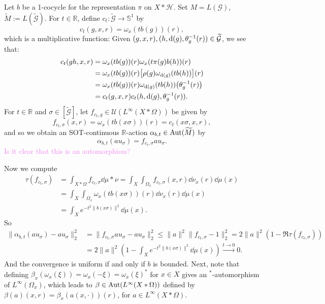 \documentclass[a4paper,11pt]{article}
\numberwithin{equation}{section}
\theoremstyle{definition}
\theoremstyle{remark}
\numberwithin{equation}{section}
\newcommand{\rG}{\mathcal{G}}
\def\H{\mathcal H}
\def\R{\mathbb{R}}
\newcommand{\Aut}{{\rm Aut}}
\def\d{{\rm d}}
\providecommand{\norm}[1]{\lVert#1\rVert}
\newcommand{\lr}[1]{\left(#1\right)}
\numberwithin{equation}{section}
\begin{document}
Let $ b $ be a 1-cocycle for the representation $ \pi $ on $ X*\H $. Set $ M = L(\rG) $, $ \widetilde{M}:=L(\widetilde{\rG}) $. For $ t\in\R $, define $ c_{t}:\widetilde{\rG}\to \mathbb S^{1} $ by
$$
  c_{t}(g,x,r) = \omega_{x}(tb(g))(r),
$$ which is a multiplicative function: Given $(g,x,r),(h,\d(g),\theta_g^{-1}(r))\in \widetilde{\rG}$, we see that: 
\begin{align*}
    c_t(gh,x,r)&=\omega_{x}(tb(g))(r)\omega_{x}(t\pi(g)b(h))(r) \\
&=\omega_{x}(tb(g))(r)\big[\rho(g)\omega_{\d(g)}(tb(h))\big](r) \\
&=\omega_{x}(tb(g))(r)\omega_{\d(g)}(tb(h))\big(\theta_g^{-1}(r)\big) \\
&=c_t(g,x,r)c_t(h,\d(g),\theta_g^{-1}(r)).
\end{align*} 
For $ t\in\R $ and $ \sigma\in [\widetilde{\rG}] $, let $ f_{c_{t},g}\in \mathcal{U}(L^{\infty}(X\ast \Omega)) $ be given by
$$
  f_{c_{t},\sigma}(x,r) = \omega_{x}(tb(x\sigma))(r)=c_t(x\sigma, x,r), 
$$ and so we obtain an SOT-continuous $\mathbb R$-action $ \alpha_{b,t}\in \Aut(\widetilde{M}) $ by 
$$
  \alpha_{b,t}(au_{\sigma}) = f_{c_{t},\sigma}au_{\sigma}.
$$ \textcolor{violet}{Is it clear that this is an automorphism?}

Now we compute
\begin{align*}
  \tau(f_{c_{t},\sigma}) &= \int_{X\ast \Omega} f_{c_{t},\sigma} \dd{\mu\ast \nu} = \int_{X} \int_{\Omega_{x}} f_{c_{t},\sigma}(x,r) \dd{\nu_{x}}(r) \dd{\mu(x)} \\
  &= \int_{X}\int_{\Omega_{x}} \omega_{x}(tb(x\sigma))(r) \dd{\nu_{x}}(r) \dd{\mu(x)} \\
  &=\int_{X} e^{-t^2\norm{b(x\sigma)}^{2}}  \dd{\mu(x)}.
\end{align*} So
\begin{align*}
  \norm{\alpha_{b,t}(au_{\sigma})-au_{\sigma}}_{2}^{2} &= \norm{f_{c_{t},\sigma}au_{\sigma}-au_{\sigma}}_{2}^2 \leq \norm{a}^{2} \norm{f_{c_{t},\sigma}-1}_{2}^{2}  = 2\norm{a}^{2}(1-\Re \tau(f_{c_{t},\sigma})) \\
  &= 2\norm{a}^{2}\lr{1-\int_{X} e^{-t^2\norm{b(x\sigma)}^{2}}\dd{\mu(x)}}\xrightarrow{t\to0}0.
\end{align*}
And the convergence is uniform if and only if $b$ is bounded. Next, note that defining $\beta_x(\omega_x(\xi))=\omega_x(-\xi)=\omega_x(\xi)^*$ for $x\in X$ gives an $^*$-automorphism of $L^\infty(\Omega_x)$, which leads to $\beta\in\Aut(L^\infty(X\ast \Omega)) $ defined by $\beta(a)(x,r)=\beta_x(a(x,\cdot))(r)$, for $a\in L^\infty(X\ast \Omega)$.
\end{document}
